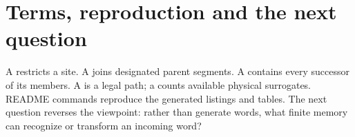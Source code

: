 \section{Terms, reproduction and the next question}
A  restricts a site. A  joins designated parent
segments. A  contains every successor of its members.
A  is a legal path; a  counts
available physical surrogates. README commands reproduce the generated listings
and tables. The next question reverses the viewpoint: rather than generate
words, what finite memory can recognize or transform an incoming word?
